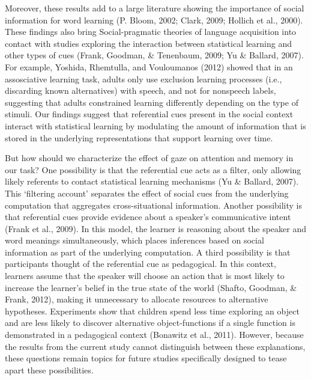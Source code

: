 \documentclass[authoryear, review]{elsarticle}
\begin{document}
Moreover, these results add to a large literature showing the importance
of social information for word learning (P. Bloom, 2002; Clark, 2009;
Hollich et al., 2000). These findings also bring Social-pragmatic
theories of language acquisition into contact with studies exploring the
interaction between statistical learning and other types of cues (Frank,
Goodman, \& Tenenbaum, 2009; Yu \& Ballard, 2007). For example, Yoshida,
Rhemtulla, and Vouloumanos (2012) showed that in an assosciative
learning task, adults only use exclusion learning processes (i.e.,
discarding known alternatives) with speech, and not for nonspeech
labels, suggesting that adults constrained learning differently
depending on the type of stimuli. Our findings suggest that referential
cues present in the social context interact with statistical learning by
modulating the amount of information that is stored in the underlying
representations that support learning over time.

But how should we characterize the effect of gaze on attention and
memory in our task? One possibility is that the referential cue acts as
a filter, only allowing likely referents to contact statistical learning
mechanisms (Yu \& Ballard, 2007). This `filtering account' separates the
effect of social cues from the underlying computation that aggregates
cross-situational information. Another possibility is that referential
cues provide evidence about a speaker's communicative intent (Frank et
al., 2009). In this model, the learner is reasoning about the speaker
and word meanings simultaneously, which places inferences based on
social information as part of the underlying computation. A third
possibility is that participants thought of the referential cue as
pedagogical. In this context, learners assume that the speaker will
choose an action that is most likely to increase the learner's belief in
the true state of the world (Shafto, Goodman, \& Frank, 2012), making it
unnecessary to allocate resources to alternative hypotheses. Experiments
show that children spend less time exploring an object and are less
likely to discover alternative object-functions if a single function is
demonstrated in a pedagogical context (Bonawitz et al., 2011). However,
because the results from the current study cannot distinguish between
these explanations, these questions remain topics for future studies
specifically designed to tease apart these possibilities.
\end{document}
